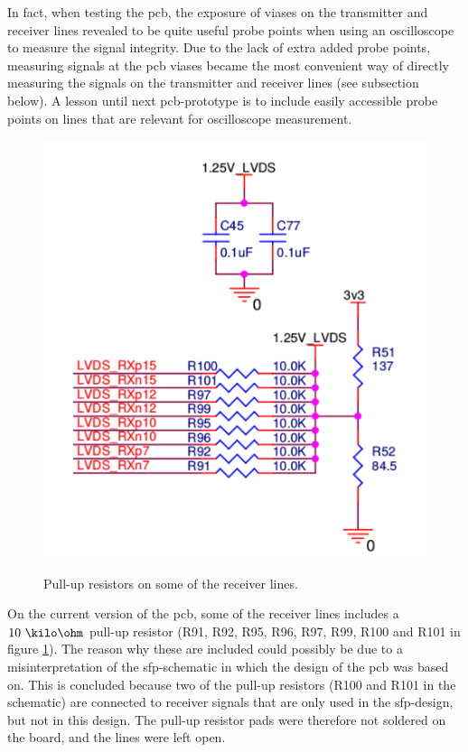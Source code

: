 \documentclass[main.tex]{subfiles}
\begin{document}
In fact, when testing the \gls{pcb}, the exposure of viases on the transmitter and receiver lines revealed to be quite useful probe points when using an oscilloscope to measure the signal integrity. Due to the lack of extra added probe points, measuring signals at the \gls{pcb} viases became the most convenient way of directly measuring the signals on the transmitter and receiver lines (see subsection below). A lesson until next \gls{pcb}-prototype is to include easily accessible probe points on lines that are relevant for oscilloscope measurement.\\

\begin{figure} %
\includegraphics[width = 7 cm]{../img/pullups}  \\[0.1 cm]
\caption{Pull-up resistors on some of the receiver lines.}
\label{fig:pullups}
\end{figure}

On the current version of the \gls{pcb}, some of the receiver lines includes a $10~\kilo\ohm$ pull-up resistor (R91, R92, R95, R96, R97, R99, R100 and R101 in figure \ref{fig:pullups}). The reason why these are included could possibly be due to a misinterpretation of the \gls{sfp}-schematic in which the design of the \gls{pcb} was based on. This is concluded because two of the pull-up resistors (R100 and R101 in the schematic) are connected to receiver signals that are only used in the \gls{sfp}-design, but not in this design. The pull-up resistor pads were therefore not soldered on the board, and the lines were left open.


\end{document}
